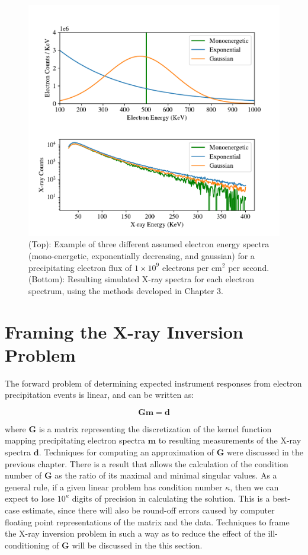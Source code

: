 \begin{figure}[p]
\label{why_ill_conditioned}
\centering
\includegraphics[width=\textwidth]{figures/chapter_4/why_ill_conditioned/why_ill_conditioned.pdf}
\caption{(Top): Example of three different assumed electron energy spectra (mono-energetic, exponentially decreasing, and gaussian) for a precipitating electron flux of $1\times10^9$ electrons per $\mbox{cm}^2$ per second. (Bottom): Resulting simulated X-ray spectra for each electron spectrum, using the methods developed in Chapter 3.} 
\end{figure}

\section{Framing the X-ray Inversion Problem}

The forward problem of determining expected instrument responses from electron precipitation events is linear, and can be written as:

$$\mathbf{G}\mathbf{m} = \mathbf{d}$$

where $\mathbf{G}$ is a matrix representing the discretization of the kernel function mapping precipitating electron spectra $\mathbf{m}$ to resulting measurements of the X-ray spectra $\mathbf{d}$. Techniques for computing an approximation of $\mathbf{G}$ were discussed in the previous chapter. There is a result that allows the calculation of the condition number of $\mathbf{G}$ as the ratio of its maximal and minimal singular values. As a general rule, if a given linear problem has condition number $\kappa$, then we can expect to lose $10^\kappa$ digits of precision in calculating the solution. This is a best-case estimate, since there will also be round-off errors caused by computer floating point representations of the matrix and the data. Techniques to frame the X-ray inversion problem in such a way as to reduce the effect of the ill-conditioning  of $\mathbf{G}$ will be discussed in the this section.

